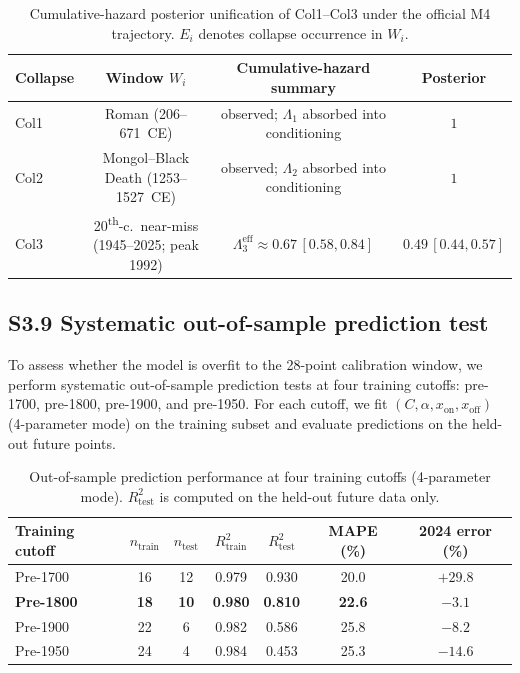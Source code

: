 \documentclass[11pt]{article}
\begin{document}
\begin{table}[H]
\centering
\caption{Cumulative-hazard posterior unification of Col1--Col3 under the official M4 trajectory.  $E_i$ denotes collapse occurrence in $W_i$.}
\label{tab:S3_col123_posterior}
\begin{tabular}{lccc}
\toprule
Collapse & Window $W_i$ & Cumulative-hazard summary & Posterior \\
\midrule
Col1 & Roman (206--671~CE) & observed; $\Lambda_1$ absorbed into conditioning & $1$ \\
Col2 & Mongol--Black Death (1253--1527~CE) & observed; $\Lambda_2$ absorbed into conditioning & $1$ \\
Col3 & 20\textsuperscript{th}-c.\ near-miss (1945--2025; peak 1992) & $\Lambda_3^{\mathrm{eff}}\approx 0.67\,[0.58,0.84]$ & $0.49\,[0.44,0.57]$ \\
\bottomrule
\end{tabular}
\end{table}

\subsection*{S3.9 Systematic out-of-sample prediction test}

To assess whether the model is overfit to the 28-point calibration window, we perform systematic out-of-sample prediction tests at four training cutoffs: pre-1700, pre-1800, pre-1900, and pre-1950.
For each cutoff, we fit $(C,\alpha,x_{\mathrm{on}},x_{\mathrm{off}})$ (4-parameter mode) on the training subset and evaluate predictions on the held-out future points.

\begin{table}[H]
\centering
\caption{Out-of-sample prediction performance at four training cutoffs (4-parameter mode). $R^2_{\mathrm{test}}$ is computed on the held-out future data only.}
\label{tab:S3_oos}
\begin{tabular}{lcccccc}
\toprule
Training cutoff & $n_{\mathrm{train}}$ & $n_{\mathrm{test}}$ & $R^2_{\mathrm{train}}$ & $R^2_{\mathrm{test}}$ & MAPE (\%) & 2024 error (\%) \\
\midrule
Pre-1700 & 16 & 12 & 0.979 & 0.930 & 20.0 & $+29.8$ \\
\textbf{Pre-1800} & \textbf{18} & \textbf{10} & \textbf{0.980} & \textbf{0.810} & \textbf{22.6} & $\mathbf{-3.1}$ \\
Pre-1900 & 22 & 6 & 0.982 & 0.586 & 25.8 & $-8.2$ \\
Pre-1950 & 24 & 4 & 0.984 & 0.453 & 25.3 & $-14.6$ \\
\bottomrule
\end{tabular}
\end{table}
\end{document}
